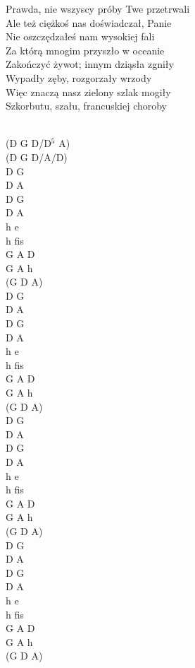 \documentclass[a5paper, 10pt]{book}
\begin{document}
\begin{minipage}[t]{0.7\textwidth}
Prawda, nie wszyscy próby Twe przetrwali\\
Ale też ciężkoś nas doświadczał, Panie\\
Nie oszczędzałeś nam wysokiej fali\\
Za którą mnogim przyszło w oceanie\\
Zakończyć żywot; innym dziąsła zgniły\\
Wypadły zęby, rozgorzały wrzody\\
Więc znaczą nasz zielony szlak mogiły\\
Szkorbutu, szału, francuskiej choroby\\
\\

\end{minipage}
\begin{minipage}[t]{0.3\textwidth}
(D G D/D$^5$ A)\\
(D G D/A/D)\\
D G\\
D A \\
D G\\
D A\\
h e \\
h fis\\
G A D\\
G A h\\
(G D A)\\

D G\\
D A \\
D G\\
D A\\
h e \\
h fis\\
G A D\\
G A h\\
(G D A)\\

D G\\
D A \\
D G\\
D A\\
h e \\
h fis\\
G A D\\
G A h\\
(G D A)\\

D G\\
D A \\
D G\\
D A\\
h e \\
h fis\\
G A D\\
G A h\\
(G D A)\\

\end{minipage}
\end{document}
